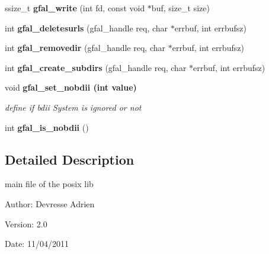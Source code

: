 \begin{CompactItemize}
\item 
ssize\_\-t \textbf{gfal\_\-write} (int fd, const void $\ast$buf, size\_\-t size)\label{group__posix__group_g00c2d64894ae81c05846b06c84727ae9}

\item 
int \textbf{gfal\_\-deletesurls} (gfal\_\-handle req, char $\ast$errbuf, int errbufsz)\label{gfal__posix_8c_72e48640200202bb9e9cf47e8a71f942}

\item 
int \textbf{gfal\_\-removedir} (gfal\_\-handle req, char $\ast$errbuf, int errbufsz)\label{gfal__posix_8c_8482ace6bde89a99f66d52bb66e012d9}

\item 
int \textbf{gfal\_\-create\_\-subdirs} (gfal\_\-handle req, char $\ast$errbuf, int errbufsz)\label{gfal__posix_8c_2a4f0aab963f1f1006953333907ecdbb}

\item 
void \bf{gfal\_\-set\_\-nobdii} (int value)
\begin{CompactList}\small\item\em define if bdii System is ignored or not \item\end{CompactList}\item 
int \textbf{gfal\_\-is\_\-nobdii} ()\label{group__internal__group_g0d2a0557bdb571ccb85c6ab5c05ae56f}

\end{CompactItemize}


\subsection{Detailed Description}
main file of the posix lib 

\begin{Desc}
\item[Author:]Devresse Adrien \end{Desc}
\begin{Desc}
\item[Version:]2.0 \end{Desc}
\begin{Desc}
\item[Date:]11/04/2011 \end{Desc}
